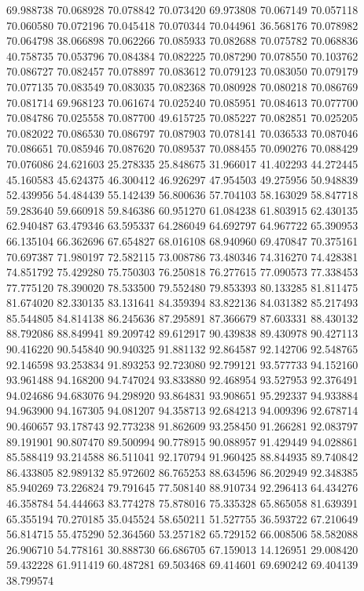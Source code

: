 69.988738
70.068928
70.078842
70.073420
69.973808
70.067149
70.057118
70.060580
70.072196
70.045418
70.070344
70.044961
36.568176
70.078982
70.064798
38.066898
70.062266
70.085933
70.082688
70.075782
70.068836
40.758735
70.053796
70.084384
70.082225
70.087290
70.078550
70.103762
70.086727
70.082457
70.078897
70.083612
70.079123
70.083050
70.079179
70.077135
70.083549
70.083035
70.082368
70.080928
70.080218
70.086769
70.081714
69.968123
70.061674
70.025240
70.085951
70.084613
70.077700
70.084786
70.025558
70.087700
49.615725
70.085227
70.082851
70.025205
70.082022
70.086530
70.086797
70.087903
70.078141
70.036533
70.087046
70.086651
70.085946
70.087620
70.089537
70.088455
70.090276
70.088429
70.076086
24.621603
25.278335
25.848675
31.966017
41.402293
44.272445
45.160583
45.624375
46.300412
46.926297
47.954503
49.275956
50.948839
52.439956
54.484439
55.142439
56.800636
57.704103
58.163029
58.847718
59.283640
59.660918
59.846386
60.951270
61.084238
61.803915
62.430135
62.940487
63.479346
63.595337
64.286049
64.692797
64.967722
65.390953
66.135104
66.362696
67.654827
68.016108
68.940960
69.470847
70.375161
70.697387
71.980197
72.582115
73.008786
73.480346
74.316270
74.428381
74.851792
75.429280
75.750303
76.250818
76.277615
77.090573
77.338453
77.775120
78.390020
78.533500
79.552480
79.853393
80.133285
81.811475
81.674020
82.330135
83.131641
84.359394
83.822136
84.031382
85.217493
85.544805
84.814138
86.245636
87.295891
87.366679
87.603331
88.430132
88.792086
88.849941
89.209742
89.612917
90.439838
89.430978
90.427113
90.416220
90.545840
90.940325
91.881132
92.864587
92.142706
92.548765
92.146598
93.253834
91.893253
92.723080
92.799121
93.577733
94.152160
93.961488
94.168200
94.747024
93.833880
92.468954
93.527953
92.376491
94.024686
94.683076
94.298920
93.864831
93.908651
95.292337
94.933884
94.963900
94.167305
94.081207
94.358713
92.684213
94.009396
92.678714
90.460657
93.178743
92.773238
91.862609
93.258450
91.266281
92.083797
89.191901
90.807470
89.500994
90.778915
90.088957
91.429449
94.028861
85.588419
93.214588
86.511041
92.170794
91.960425
88.844935
89.740842
86.433805
82.989132
85.972602
86.765253
88.634596
86.202949
92.348385
85.940269
73.226824
79.791645
77.508140
88.910734
92.296413
64.434276
46.358784
54.444663
83.774278
75.878016
75.335328
65.865058
81.639391
65.355194
70.270185
35.045524
58.650211
51.527755
36.593722
67.210649
56.814715
55.475290
52.364560
53.257182
65.729152
66.008506
58.582088
26.906710
54.778161
30.888730
66.686705
67.159013
14.126951
29.008420
59.432228
61.911419
60.487281
69.503468
69.414601
69.690242
69.404139
38.799574
